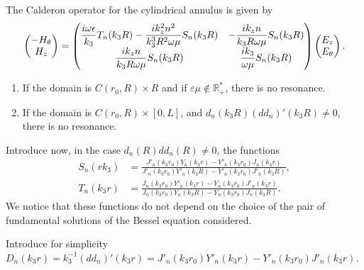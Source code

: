             \begin{lemma} The Calderon operator for the cylindrical annulus is given by
            $$
                \begin{pmatrix}
                    -H_{\theta}
                    \cr
                    H_z
                \end{pmatrix}
                =
                    \begin{pmatrix}
                        \frac{i\omega \epsilon}{k_3}T_n(k_3R)-\frac{ik_z^2n^2}{k_3^3R^2\omega \mu}S_n(k_3R) & -\frac{ik_zn}{k_3R\omega \mu}S_n(k_3R)
                        \cr
                        \frac{ik_zn}{k_3R\omega \mu}S_n(k_3R) & \frac{ik_3}{\omega \mu}S_n(k_3R)
                    \end{pmatrix}
                    \begin{pmatrix}
                        E_z
                        \cr
                        E_{\theta}
                    \end{pmatrix}.
            $$
            \end{lemma}

            \begin{lemma}
                \begin{enumerate}
                \item If the domain is $C(r_0,R)\times R$ and if $\varepsilon \mu \notin \mathbb R^*_+$, there is no resonance.
                \item If the domain is $C(r_0, R)\times [0,L]$, and $d_n(k_3R)(dd_n)'(k_3R)\not=0$, there is no resonance.
                \end{enumerate}
            \end{lemma}
            Introduce now, in the case $d_n(R)dd_n(R)\not=0$, the functions
            \begin{align*}
                S_n(rk_3) &= \frac{J'_n(k_3r_0)Y_n(k_3r)-Y'_n(k_3r_0)J_n(k_3r)}{J'_n(k_3r_0)Y'_n(k_3R)-Y'_n(k_3r_0)J'_n(k_3R)},
                \\
                T_n(k_3r) &= \frac{J_n(k_3r_0)Y'_n(k_3r)-Y_n(k_3r_0)J'_n(k_3r)}{J_n(k_3r_0)Y_n(k_3R)-Y_n(k_3r_0)J_n(k_3R)}.
            \end{align*}
            We notice that these functions do not depend on the choice of the pair of fundamental solutions of the Bessel equation considered. 

            Introduce for simplicity $D_n(k_3r)=k_3^{-1}(dd_n)'(k_3r)= J'_n(k_3r_0)Y'_n(k_3r)-Y'_n(k_3r_0)J'_n(k_3r)$.

